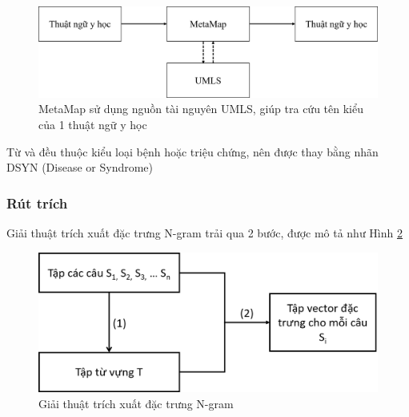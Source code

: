 \begin{figure}[H]
\centering
\includegraphics[scale=0.32]{../hinh/metamap.png}
\caption{MetaMap sử dụng nguồn tài nguyên UMLS, giúp tra cứu tên kiểu của 1 thuật ngữ y học}
\label{fig:metamap}
\end{figure}
Từ {} và {} đều thuộc kiểu loại bệnh hoặc triệu chứng, nên được thay bằng nhãn DSYN (Disease or Syndrome)
\subsubsection*{Rút trích}
Giải thuật trích xuất đặc trưng N-gram trải qua 2 bước, được mô tả như Hình \ref{fig:mo-hinh-ngram}\\
\begin{figure}[H]
\centering
\includegraphics[scale=0.30]{../hinh/mo-hinh-ngram.png}
\caption{Giải thuật trích xuất đặc trưng N-gram} \label{fig:mo-hinh-ngram}
\end{figure}

